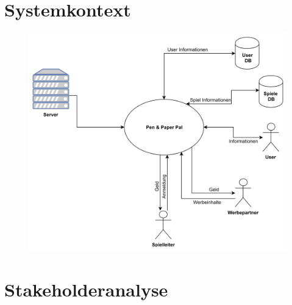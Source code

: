 \documentclass[DIV=13, 10pt,a4paper]{scrartcl} %
\begin{document}
\section{Systemkontext}
\begin{figure}[h!]
	\centering
	\includegraphics[width = \textwidth]{docs/03_03_Systemkontext.jpg}
\end{figure}

\section{Stakeholderanalyse}
\end{document}
